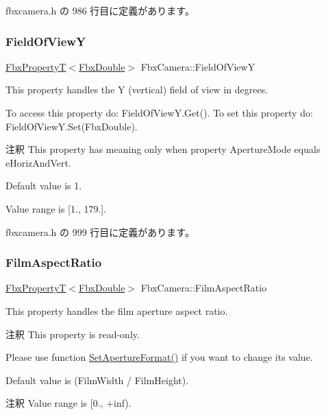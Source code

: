  fbxcamera.\+h の 986 行目に定義があります。

\mbox{\label{class_fbx_camera_a924b7ae9b8256f04bd36d726f0131c98}} 
\subsubsection{\texorpdfstring{Field\+Of\+ViewY}{FieldOfViewY}}
{\footnotesize\ttfamily \hyperlink{class_fbx_property_t}{Fbx\+PropertyT}$<$\hyperlink{fbxtypes_8h_a171e72a1c46fc15c1a6c9c31948c1c5b}{Fbx\+Double}$>$ Fbx\+Camera\+::\+Field\+Of\+ViewY}

This property handles the Y (vertical) field of view in degrees.

To access this property do\+: Field\+Of\+View\+Y.\+Get(). To set this property do\+: Field\+Of\+View\+Y.\+Set(\+Fbx\+Double).

\begin{DoxyRemark}{注釈}
This property has meaning only when property Aperture\+Mode equals e\+Horiz\+And\+Vert.

Default value is 1. 

Value range is \mbox{[}1., 179.\mbox{]}. 
\end{DoxyRemark}


 fbxcamera.\+h の 999 行目に定義があります。

\mbox{\label{class_fbx_camera_aeefc9d0c4a6c9c3e17dc265cf2621a47}} 
\subsubsection{\texorpdfstring{Film\+Aspect\+Ratio}{FilmAspectRatio}}
{\footnotesize\ttfamily \hyperlink{class_fbx_property_t}{Fbx\+PropertyT}$<$\hyperlink{fbxtypes_8h_a171e72a1c46fc15c1a6c9c31948c1c5b}{Fbx\+Double}$>$ Fbx\+Camera\+::\+Film\+Aspect\+Ratio}

This property handles the film aperture aspect ratio.

\begin{DoxyRemark}{注釈}
This property is read-\/only. 

Please use function \hyperlink{class_fbx_camera_a5b644b41e4d72c214acfdb5a2dee7576}{Set\+Aperture\+Format()} if you want to change its value.
\end{DoxyRemark}
Default value is (Film\+Width / Film\+Height). \begin{DoxyRemark}{注釈}
Value range is \mbox{[}0., +inf). 
\end{DoxyRemark}


